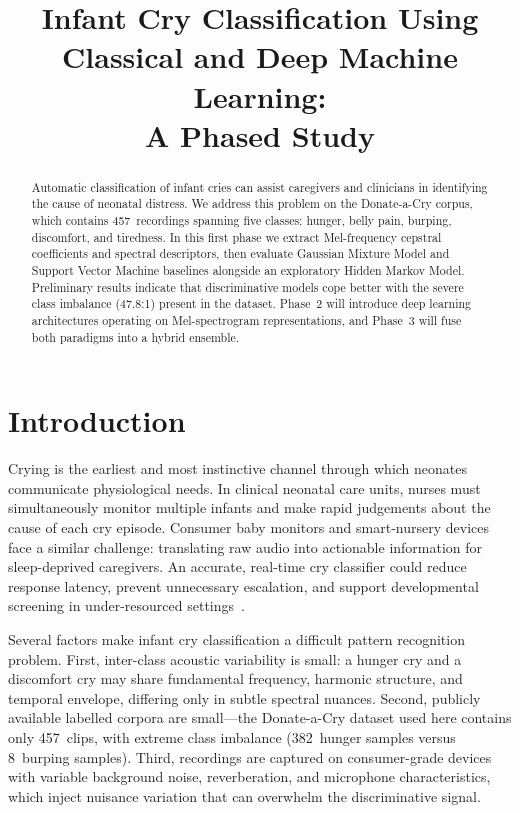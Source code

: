 \documentclass[conference]{IEEEtran}
\title{Infant Cry Classification Using Classical and Deep Machine Learning:\\
       A Phased Study}
\author{
  \IEEEauthorblockN{Belal Raza}
  \IEEEauthorblockA{Department of Computer Science\\
  Email: belal.raza@example.ac.uk}
}
\begin{document}
\maketitle

\begin{abstract}
Automatic classification of infant cries can assist caregivers and
clinicians in identifying the cause of neonatal distress.  We address
this problem on the Donate-a-Cry corpus, which contains 457~recordings
spanning five classes: hunger, belly pain, burping, discomfort, and
tiredness.  In this first phase we extract Mel-frequency cepstral
coefficients and spectral descriptors, then evaluate Gaussian Mixture
Model and Support Vector Machine baselines alongside an exploratory
Hidden Markov Model.  Preliminary results indicate that discriminative
models cope better with the severe class imbalance (47.8:1) present in
the dataset.  Phase~2 will introduce deep learning architectures
operating on Mel-spectrogram representations, and Phase~3 will fuse both
paradigms into a hybrid ensemble.
\end{abstract}

\section{Introduction}
\label{sec:intro}

Crying is the earliest and most instinctive channel through which
neonates communicate physiological needs.  In clinical neonatal care
units, nurses must simultaneously monitor multiple infants and make rapid
judgements about the cause of each cry episode.  Consumer baby monitors
and smart-nursery devices face a similar challenge: translating raw audio
into actionable information for sleep-deprived caregivers.  An accurate,
real-time cry classifier could reduce response latency, prevent
unnecessary escalation, and support developmental screening in
under-resourced settings~\cite{dunstan2006}.

Several factors make infant cry classification a difficult pattern
recognition problem.  First, inter-class acoustic variability is small:
a hunger cry and a discomfort cry may share fundamental frequency,
harmonic structure, and temporal envelope, differing only in subtle
spectral nuances.  Second, publicly available labelled corpora are
small---the Donate-a-Cry dataset used here contains only 457~clips, with
extreme class imbalance (382~hunger samples versus 8~burping samples).
Third, recordings are captured on consumer-grade devices with variable
background noise, reverberation, and microphone characteristics, which
inject nuisance variation that can overwhelm the discriminative signal.
\end{document}
